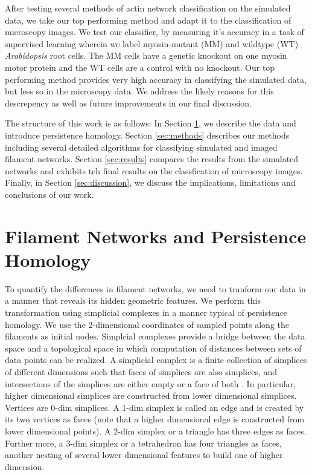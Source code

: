 \documentclass[10pt]{article}
\begin{document}
After testing several methods of actin network classification on the simulated data, we take our top performing method and adapt it to the classification of microscopy images. We test our classifier, by measuring it's accuracy in a task of supervised learning wherein we label  myosin-mutant (MM) and wildtype (WT) \textit{Arabidopsis} root cells. The MM cells have a genetic knockout on one myosin motor protein and the WT cells are a control with no knockout. Our top performing method provides very high accuracy in classifying the simulated data, but less so in the microscopy data. We address the likely reasons for this descrepency as well as future improvements in our final discussion.

The structure of this work is as follows: In Section \ref{sec:networksAndHomology}, we describe the data and introduce persistence homology. Section \ref{sec:methods} describes our methods including several detailed algorithms for classifying simulated and imaged filament networks. Section \ref{sec:results} compares the results from the simulated networks and exhibits teh final results on the classfication of microscopy images. Finally, in Section \ref{sec:discussion}, we discuss the implications, limitations and conclusions of our work.

\section{Filament Networks and Persistence Homology}\label{sec:networksAndHomology}
To quantify the differences in filament networks, we need to tranform our data in a manner that reveals its hidden geometric features. We perform this transformation using simplicial complexes in a manner typical of persistence homology. We use the 2-dimensional coordinates of sampled points along the filaments as initial nodes. Simplcial complexes provide a bridge between the data space and a topological space in which computation of distances between sets of data points can be realized. A simplicial complex is a finite collection of simplices of different dimensions such that faces of simplices are also simplices, and intersections of the simplices are either empty or a face of both \cite{edelsbrunner2010computational}. In particular, higher dimensional simplices are constructed from lower dimensional simplices. Vertices are 0-dim simplices. A 1-dim simplex is called an edge and is created by its two vertices as faces (note that a higher dimensional edge is constructed from lower dimensional points). A 2-dim simplex or a triangle has three edges as faces. Further more, a 3-dim simplex or a tetrahedron has four triangles as faces, another nesting of several lower dimensional features to build one of higher dimension.
\end{document}
